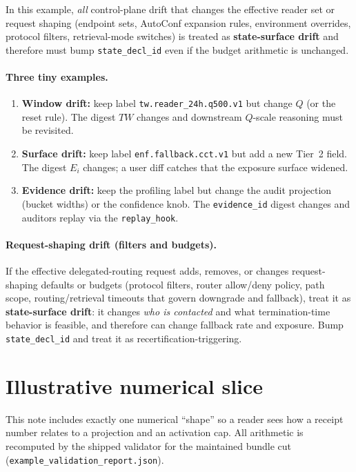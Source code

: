 \documentclass[11pt]{article}
\begin{document}
In this example, \emph{all} control-plane drift that changes the effective reader set or request shaping (endpoint sets, AutoConf expansion rules, environment overrides, protocol filters, retrieval-mode switches) is treated as \textbf{state-surface drift} and therefore must bump \texttt{state\_decl\_id} even if the budget arithmetic is unchanged.\cite{series:deployedsurfaces,series:planstateequiv}

\paragraph{Three tiny examples.}
\begin{enumerate}[leftmargin=*]
\item \textbf{Window drift:} keep label \texttt{tw.reader\_24h.q500.v1} but change $Q$ (or the reset rule). The digest $TW$ changes and downstream $Q$-scale reasoning must be revisited.\cite{series:threatwindows}
\item \textbf{Surface drift:} keep label \texttt{enf.fallback.cct.v1} but add a new Tier~2 field. The digest $E_i$ changes; a user diff catches that the exposure surface widened.\cite{series:traceifaces}
\item \textbf{Evidence drift:} keep the profiling label but change the audit projection (bucket widths) or the confidence knob. The \texttt{evidence\_id} digest changes and auditors replay via the \texttt{replay\_hook}.\cite{series:receiptitems,series:auditorreplay}
\end{enumerate}




\paragraph{Request-shaping drift (filters and budgets).}
If the effective delegated-routing request adds, removes, or changes request-shaping defaults or budgets (protocol filters, router allow/deny policy, path scope, routing/retrieval timeouts that govern downgrade and fallback), treat it as \textbf{state-surface drift}: it changes \emph{who is contacted} and what termination-time behavior is feasible, and therefore can change fallback rate and exposure.
Bump \texttt{state\_decl\_id} and treat it as recertification-triggering.\cite{series:deployedsurfaces,series:planstateequiv}

\section{Illustrative numerical slice}
\label{sec:numerical}
This note includes exactly one numerical ``shape'' so a reader sees how a receipt number relates to a projection and an activation cap.
All arithmetic is recomputed by the shipped validator for the maintained bundle cut (\texttt{example\_validation\_report.json}).\cite{series:auditorreplay}
\end{document}
